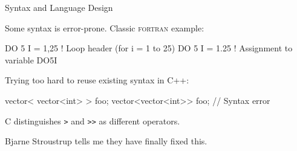 \documentclass{plt}
\begin{document}
\begin{frame}[fragile]{Syntax and Language Design}

Some syntax is error-prone.  Classic \textsc{fortran} example:

\begin{fortran}
DO 5 I = 1,25  ! Loop header (for i = 1 to 25)
DO 5 I = 1.25  ! Assignment to variable DO5I
\end{fortran}

Trying too hard to reuse existing syntax in C++:

\begin{cpp}
vector< vector<int> > foo;
vector<vector<int>> foo; // Syntax error
\end{cpp}

C distinguishes \verb|>| and \verb|>>| as different operators.

Bjarne Stroustrup tells me they have finally fixed this.

\end{frame}
\end{document}
